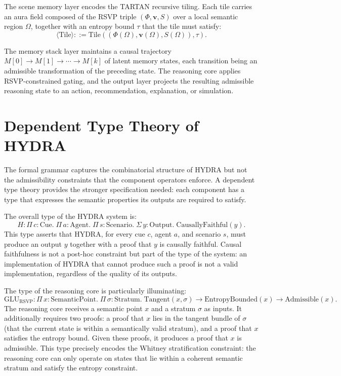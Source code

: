 \documentclass[12pt, a4paper, openany]{book}
\theoremstyle{plain}
\theoremstyle{definition}
\theoremstyle{remark}
\newcommand{\vvec}{\mathbf{v}}
\newcommand{\Sfield}{S}
\begin{document}
The scene memory layer encodes the TARTAN recursive tiling. Each tile carries an aura field composed of the RSVP triple $(\Phi, \vvec, \Sfield)$ over a local semantic region $\Omega$, together with an entropy bound $\tau$ that the tile must satisfy:
\[
\langle\text{Tile}\rangle ::= \mathrm{Tile}((\Phi(\Omega), \vvec(\Omega), \Sfield(\Omega)), \tau).
\]

The memory stack layer maintains a causal trajectory $M[0] \to M[1] \to \cdots \to M[k]$ of latent memory states, each transition being an admissible transformation of the preceding state. The reasoning core applies RSVP-constrained gating, and the output layer projects the resulting admissible reasoning state to an action, recommendation, explanation, or simulation.

\section{Dependent Type Theory of HYDRA}

The formal grammar captures the combinatorial structure of HYDRA but not the admissibility constraints that the component operators enforce. A dependent type theory provides the stronger specification needed: each component has a type that expresses the semantic properties its outputs are required to satisfy.

The overall type of the HYDRA system is:
\[
H : \Pi\, c : \mathrm{Cue}.\; \Pi\, a : \mathrm{Agent}.\; \Pi\, s : \mathrm{Scenario}.\;
\Sigma\, y : \mathrm{Output}.\; \mathrm{CausallyFaithful}(y).
\]
This type asserts that HYDRA, for every cue $c$, agent $a$, and scenario $s$, must produce an output $y$ together with a proof that $y$ is causally faithful. Causal faithfulness is not a post-hoc constraint but part of the type of the system: an implementation of HYDRA that cannot produce such a proof is not a valid implementation, regardless of the quality of its outputs.

The type of the reasoning core is particularly illuminating:
\[
\mathrm{GLU}_{\mathrm{RSVP}} : \Pi\, x : \mathrm{SemanticPoint}.\; \Pi\, \sigma : \mathrm{Stratum}.\;
\mathrm{Tangent}(x, \sigma) \to \mathrm{EntropyBounded}(x) \to \mathrm{Admissible}(x).
\]
The reasoning core receives a semantic point $x$ and a stratum $\sigma$ as inputs. It additionally requires two proofs: a proof that $x$ lies in the tangent bundle of $\sigma$ (that the current state is within a semantically valid stratum), and a proof that $x$ satisfies the entropy bound. Given these proofs, it produces a proof that $x$ is admissible. This type precisely encodes the Whitney stratification constraint: the reasoning core can only operate on states that lie within a coherent semantic stratum and satisfy the entropy constraint.
\end{document}
